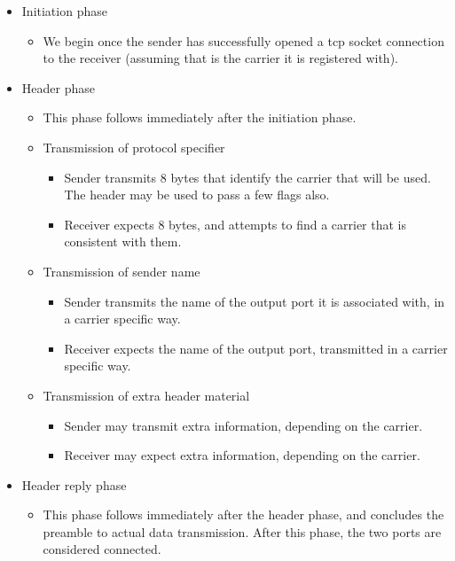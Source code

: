\begin{itemize}

\item Initiation phase
  \begin{itemize}
  \item We begin once the sender has
    successfully opened a tcp socket connection to the receiver
    (assuming that is the carrier it is registered with).
  \end{itemize}

\item Header phase
  \begin{itemize}
  \item This phase follows immediately after the initiation phase.
  \item Transmission of protocol specifier
    \begin{itemize}
      \item Sender transmits 8 bytes that identify the carrier
	that will be used.  The header may be used to pass a 
	few flags also.
      \item Receiver expects 8 bytes, and attempts to find a
	carrier that is consistent with them.
    \end{itemize}
  \item Transmission of sender name
    \begin{itemize}
      \item Sender transmits the name of the output port
	it is associated with, in a carrier specific way.
      \item Receiver expects the name of the output port,
	transmitted in a carrier specific way.
    \end{itemize}
  \item Transmission of extra header material
    \begin{itemize}
      \item Sender may transmit extra information, depending on
      the carrier.
      \item Receiver may expect extra information, depending on
      the carrier.
    \end{itemize}
  \end{itemize}

\item Header reply phase

  \begin{itemize}
    
  \item This phase follows immediately after the header phase, and
    concludes the preamble to actual data transmission.  After this
    phase, the two ports are considered connected.
    

\end{itemize}
\end{itemize}
